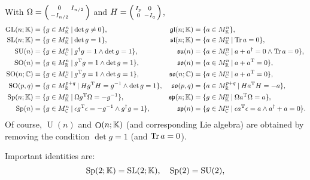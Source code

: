 \documentclass[CheatSheet]{subfiles}
\begin{document}
With $\Omega=\left(\begin{smallmatrix}0&I_{n/2}\\-I_{n/2}\end{smallmatrix}\right)$ and $H=\left(\begin{smallmatrix}I_p&0\\0&-I_q\end{smallmatrix}\right)$,
\begin{align}
 \mathop{\mathrm  {GL}}(n;\KK) &= \{g\in M^n_\KK\mathbin|\det g\neq 0\},&
 \mathop{\mathfrak{gl}}(n;\KK) &= \{a\in M^n_\KK\},\\
%
 \mathop{\mathrm  {SL}}(n;\KK) &= \{g\in M^n_\KK\mathbin|\det g=1\},&
 \mathop{\mathfrak{sl}}(n;\KK) &= \{a\in M^n_\KK\mathbin|\Tr a=0\},\\
%
 \mathop{\mathrm  {SU}}(n) &= \{g\in M^n_{\mathbb C}\mathbin|g^\dagger g=1\land\det g=1\},&
 \mathop{\mathfrak{su}}(n) &= \{a\in M^n_{\mathbb C}\mathbin|a+a^\dagger=0\land\Tr a=0\},\\
%
 \mathop{\mathrm  {SO}}(n) &= \{g\in M^n_{\mathbb R}\mathbin|g^\TT g=1\land\det g=1\},&
 \mathop{\mathfrak{so}}(n) &= \{a\in M^n_{\mathbb R}\mathbin|a+a^\TT=0\},\\
%
 \mathop{\mathrm  {SO}}(n;\mathbb C) &= \{g\in M^n_{\mathbb C}\mathbin|g^\TT g=1\land\det g=1\},&
 \mathop{\mathfrak{so}}(n;\mathbb C) &= \{a\in M^n_{\mathbb C}\mathbin|a+a^\TT=0\},\\
%
 \mathop{\mathrm  {SO}}(p,q) &= \{g\in M^{p+q}_{\mathbb R}\mathbin|H g^\TT H=g^{-1}\land\det g=1\},&
 \mathop{\mathfrak{so}}(p,q) &= \{a\in M^{p+q}_{\mathbb R}\mathbin|H a^\TT H=-a\},\\
%
 \mathop{\mathrm  {Sp}}(n;\KK) &= \{g\in M^n_\KK\mathbin|\Omega g^\TT \Omega=-g^{-1}\},&
 \mathop{\mathfrak{sp}}(n;\KK) &= \{g\in M^n_\KK\mathbin|\Omega a^\TT \Omega=a\},\\
%
 \mathop{\mathrm  {Sp}}(n) &= \{g\in M^n_{\mathbb C}\mathbin|\epsilon g^\TT \epsilon=-g^{-1}\land g^\dagger g=1\},&
 \mathop{\mathfrak{sp}}(n) &= \{g\in M^n_{\mathbb C}\mathbin|\epsilon a^\TT \epsilon=a\land a^\dagger+a=0\}.
\end{align}
Of course, $\mathop{\mathrm{U}}(n)$ and $\mathop{\mathrm{O}}(n;{\mathbb{K}})$ (and corresponding Lie algebra) are obtained by removing the condition $\det g=1$ (and $\operatorname{\mathrm{Tr}} a=0$).


Important identities are:
\begin{equation}
 \operatorname{\mathrm Sp}(2;{\mathbb{K}})=\operatorname{\mathrm SL}(2;{\mathbb{K}}),\quad \operatorname{\mathrm Sp}(2)=\operatorname{\mathrm SU}(2),
\end{equation}
\end{document}
